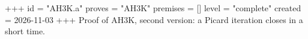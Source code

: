+++
id = "AH3K.a"
proves = "AH3K"
premises = []
level = "complete"
created = 2026-11-03
+++
Proof of AH3K, second version: a Picard iteration closes in a short time.
